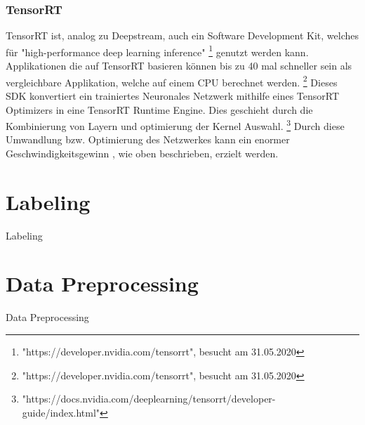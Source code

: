 \documentclass[a4paper,oneside,12pt]{report}
\begin{document}
\begin{onehalfspace}
		\subsection{TensorRT}
		TensorRT ist, analog zu Deepstream, auch ein Software Development Kit, welches für "high-performance deep learning inference"
		\footnote{"https://developer.nvidia.com/tensorrt", besucht am 31.05.2020} genutzt werden kann.
		Applikationen die auf TensorRT basieren können bis zu 40 mal schneller sein als vergleichbare Applikation, welche auf einem CPU berechnet werden.
		\footnote{"https://developer.nvidia.com/tensorrt", besucht am 31.05.2020}
		Dieses SDK konvertiert ein trainiertes Neuronales Netzwerk mithilfe eines TensorRT Optimizers in eine TensorRT Runtime Engine. Dies geschieht durch die Kombinierung von Layern und optimierung der Kernel Auswahl.
		\footnote{"https://docs.nvidia.com/deeplearning/tensorrt/developer-guide/index.html"}
		Durch diese Umwandlung bzw. Optimierung des Netzwerkes kann ein enormer Geschwindigkeitsgewinn , wie oben beschrieben, erzielt werden.
	\end{onehalfspace}
	\chapter{Labeling}
	\begin{onehalfspace}
		Labeling
	\end{onehalfspace}
	\chapter{Data Preprocessing}
	\begin{onehalfspace}
		Data Preprocessing
	\end{onehalfspace}
\end{document}
